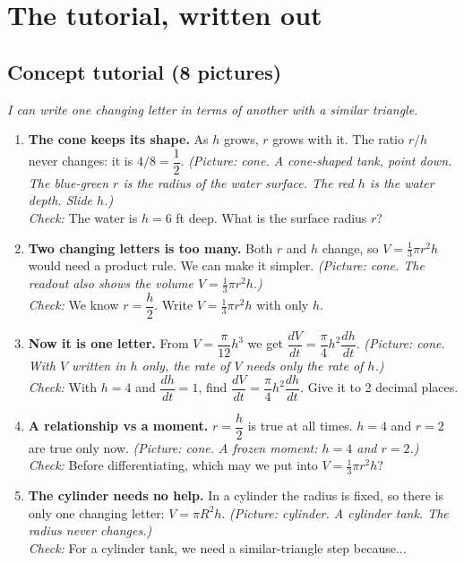 \documentclass[11pt]{article}
\begin{document}
\section*{The tutorial, written out}
\subsection*{Concept tutorial (8 pictures)}
\textit{I can write one changing letter in terms of another with a similar triangle.}\par
\begin{enumerate}
\item \textbf{The cone keeps its shape.} As $h$ grows, $r$ grows with it. The ratio $r/h$ never changes: it is $4/8=\dfrac12$. \textit{(Picture: cone. A cone-shaped tank, point down. The blue-green $r$ is the radius of the water surface. The red $h$ is the water depth. Slide $h$.)}\\ \textit{Check:} The water is $h=6$ ft deep. What is the surface radius $r$? 
\item \textbf{Two changing letters is too many.} Both $r$ and $h$ change, so $V=\tfrac13\pi r^2h$ would need a product rule. We can make it simpler. \textit{(Picture: cone. The readout also shows the volume $V=\tfrac13\pi r^2h$.)}\\ \textit{Check:} We know $r=\dfrac h2$. Write $V=\tfrac13\pi r^2h$ with only $h$. 
\item \textbf{Now it is one letter.} From $V=\dfrac{\pi}{12}h^3$ we get $\dfrac{dV}{dt}=\dfrac{\pi}{4}h^2\dfrac{dh}{dt}$. \textit{(Picture: cone. With $V$ written in $h$ only, the rate of $V$ needs only the rate of $h$.)}\\ \textit{Check:} With $h=4$ and $\dfrac{dh}{dt}=1$, find $\dfrac{dV}{dt}=\dfrac{\pi}{4}h^2\dfrac{dh}{dt}$. Give it to 2 decimal places. 
\item \textbf{A relationship vs a moment.} $r=\dfrac h2$ is true at all times. $h=4$ and $r=2$ are true only now. \textit{(Picture: cone. A frozen moment: $h=4$ and $r=2$.)}\\ \textit{Check:} Before differentiating, which may we put into $V=\tfrac13\pi r^2h$? 
\item \textbf{The cylinder needs no help.} In a cylinder the radius is fixed, so there is only one changing letter: $V=\pi R^2h$. \textit{(Picture: cylinder. A cylinder tank. The radius never changes.)}\\ \textit{Check:} For a cylinder tank, we need a similar-triangle step because... 

\end{enumerate}
\end{document}
